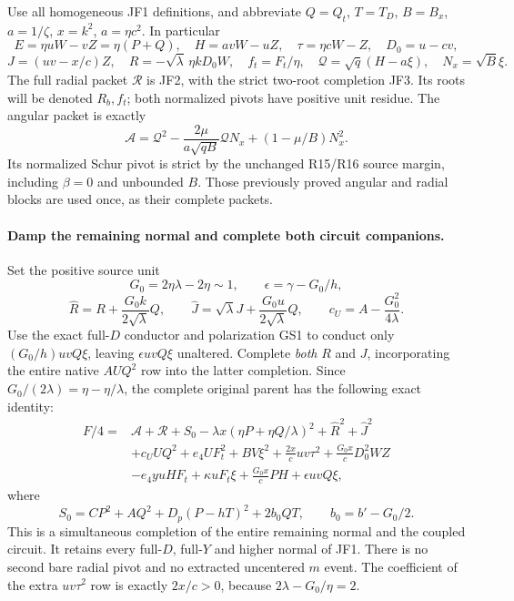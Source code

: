 Use all homogeneous JF1 definitions, and abbreviate $Q=Q_t$,
$T=T_D$, $B=B_x$, $a=1/\zeta$, $x=k^2$, $a=\eta c^2$. In particular
\[
 E=\eta uW-vZ=\eta(P+Q),\quad H=avW-uZ,
 \quad \tau=\eta cW-Z,\quad D_0=u-cv,
\]
\[
 J=(uv-x/c)Z,\quad
 R=-\sqrt\lambda\,\eta kD_0W,\quad
 f_t=F_t/\eta,\quad \mathcal Q=\sqrt q(H-a\xi),
 \quad N_x=\sqrt B\xi.
\]
The full radial packet $\mathscr R$ is JF2, with the strict two-root
completion JF3. Its roots will be denoted $R_b,f_t$; both normalized
pivots have positive unit residue. The angular packet is exactly
\[
 \mathscr A=\mathcal Q^2
       -\frac{2\mu}{a\sqrt{qB}}\mathcal QN_x
       +(1-\mu/B)N_x^2.                              \tag{DG2}
\]
Its normalized Schur pivot is strict by the unchanged R15/R16 source
margin, including $\beta=0$ and unbounded $B$. Those previously
proved angular and radial blocks are used once, as their complete
packets.

\paragraph{Damp the remaining normal and complete both circuit companions.}
Set the positive source unit
\[
 G_0=2\eta\lambda-2\eta\sim1,\qquad
 \epsilon=\gamma-G_0/h,
\]
\[
 \widehat R=R+\frac{G_0k}{2\sqrt\lambda}Q,
 \qquad \widehat J=\sqrt\lambda J+
                         \frac{G_0u}{2\sqrt\lambda}Q,
 \qquad c_U=A-\frac{G_0^2}{4\lambda}.
\]
Use the exact full-$D$ conductor and polarization GS1 to conduct only
$(G_0/h)uvQ\xi$, leaving $\epsilon uvQ\xi$ unaltered. Complete
\emph{both} $R$ and $J$, incorporating the entire native $AUQ^2$
row into the latter completion. Since
$G_0/(2\lambda)=\eta-\eta/\lambda$, the complete original parent
has the following exact identity:
\[
\begin{split}
 F/4={}&\mathscr A+\mathscr R+S_0
    -\lambda x(\eta P+\eta Q/\lambda)^2
    +\widehat R^2+\widehat J^2\\
 &+c_UUQ^2+e_4UF_t^2+BV\xi^2
    +\frac{2x}{c}uv\tau^2
    +\frac{G_0x}{c}D_0^2WZ\\
 &-e_4yuHF_t+\kappa uF_t\xi
                 +\frac{G_0x}{c}PH+\epsilon uvQ\xi,       
\end{split}\tag{DG3}
\]
where
\[
 S_0=CP^2+AQ^2+D_p(P-hT)^2+2b_0QT,
 \qquad b_0=b'-G_0/2.                                 \tag{DG4}
\]
This is a simultaneous completion of the entire remaining normal and
the coupled circuit. It retains every full-$D$, full-$Y$ and higher
normal of JF1. There is no second bare radial pivot and no extracted
uncentered $m$ event. The coefficient of the extra $uv\tau^2$ row
is exactly $2x/c>0$, because $2\lambda-G_0/\eta=2$.

